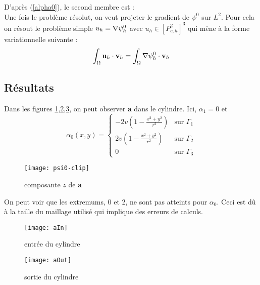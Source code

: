 D'après (\ref{alpha0}), le second membre est :\\


Une fois le problème résolut, on veut projeter le gradient de $\psi^0$ sur $L^2$. Pour cela on résout le problème simple $u_h={\nabla}\psi_h^0$ avec $u_h\in [P^2_{c,h}]^3$ qui mène à la forme variationnelle suivante :
\[ \int_\Omega \mathbf{u}_h\cdot\mathbf{v}_h = \int_\Omega {\nabla}\psi_h^0\cdot\mathbf{v}_h \]



\subsection{Résultats}
Dans les figures \ref{az},\ref{aIn},\ref{aOut}, on peut observer $\mathbf{a}$ dans le cylindre. Ici, $\alpha_1=0$ et 
\[ \alpha_0(x,y)= \begin{cases} -2v\left(1-\frac{x^2+y^2}{r^2}\right) &\mbox{sur } \Gamma_1\\
2v\left(1-\frac{x^2+y^2}{r^2}\right)&\mbox{sur } \Gamma_2\\
0 &\mbox{sur } \Gamma_3 \end{cases} \]

\begin{figure}[H]
\centering
\texttt{[image: psi0-clip]}
\caption{composante $z$ de $\mathbf{a}$}
\label{az}
\end{figure}
On peut voir que les extremums, 0 et 2, ne sont pas atteints pour $\alpha_0$. Ceci est dû à la taille du maillage utilisé qui implique des erreurs de calculs. 
\begin{figure}[H]
\centering
\texttt{[image: aIn]}
\caption{entrée du cylindre}
\label{aIn}
\end{figure}
\begin{figure}[H]
\centering
\texttt{[image: aOut]}
\caption{sortie du cylindre}
\label{aOut}
\end{figure}


